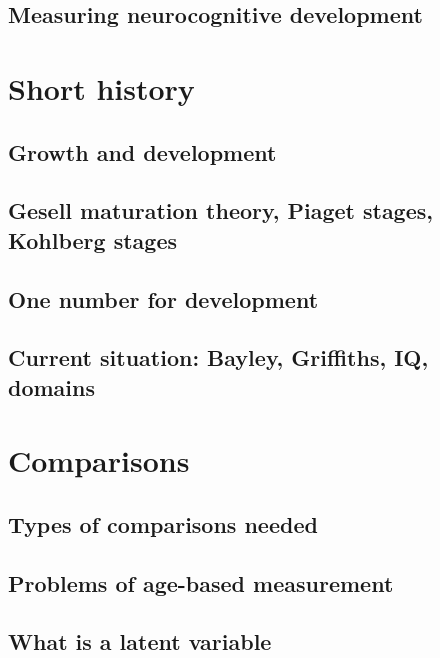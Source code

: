 \documentclass[]{book}
\begin{document}
\section{Measuring neurocognitive
development}\label{measuring-neurocognitive-development}

\chapter{Short history}\label{short-history}

\section{Growth and development}\label{growth-and-development}

\section{Gesell maturation theory, Piaget stages, Kohlberg
stages}\label{gesell-maturation-theory-piaget-stages-kohlberg-stages}

\section{One number for development}\label{one-number-for-development}

\section{Current situation: Bayley, Griffiths, IQ,
domains}\label{current-situation-bayley-griffiths-iq-domains}

\chapter{Comparisons}\label{comparisons}

\section{Types of comparisons needed}\label{types-of-comparisons-needed}

\section{Problems of age-based
measurement}\label{problems-of-age-based-measurement}

\section{What is a latent variable}\label{what-is-a-latent-variable}
\end{document}

